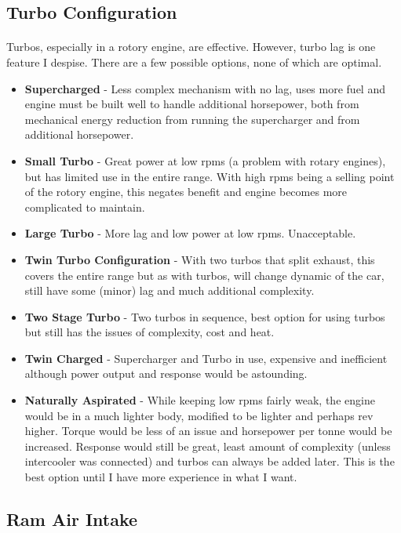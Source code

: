 \documentclass[a4paper,10pt]{report}
\begin{document}
\subsection{Turbo Configuration} 
\paragraph*{}Turbos, especially in a rotory engine, are effective. However, turbo lag is one feature I despise. There are a few possible options, none of which are optimal. 
\begin{itemize}
 \item \textbf{Supercharged} - Less complex mechanism with no lag, uses more fuel and engine must be built well to handle additional horsepower, both from mechanical energy reduction from running the supercharger and from additional horsepower.
 \item \textbf{Small Turbo} - Great power at low rpms (a problem with rotary engines), but has limited use in the entire range. With high rpms being a selling point of the rotory engine, this negates benefit and engine becomes more complicated to maintain.
 \item \textbf{Large Turbo} - More lag and low power at low rpms. Unacceptable.
 \item \textbf{Twin Turbo Configuration} - With two turbos that split exhaust, this covers the entire range but as with turbos, will change dynamic of the car, still have some (minor) lag and much additional complexity.
 \item \textbf{Two Stage Turbo} - Two turbos in sequence, best option for using turbos but still has the issues of complexity, cost and heat.
 \item \textbf{Twin Charged} - Supercharger and Turbo in use, expensive and inefficient although power output and response would be astounding.
 \item \textbf{Naturally Aspirated} - While keeping low rpms fairly weak, the engine would be in a much lighter body, modified to be lighter and perhaps rev higher. Torque would be less of an issue and horsepower per tonne would be increased. Response would still be great, least amount of complexity (unless intercooler was connected) and turbos can always be added later. This is the best option until I have more experience in what I want.
\end{itemize}
\subsection{Ram Air Intake}
\end{document}
